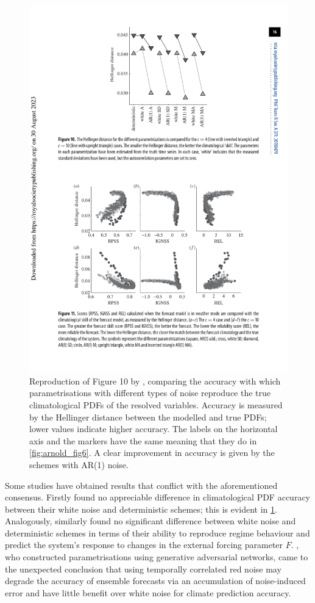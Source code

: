 \documentclass[titlepage,twoside]{article}
\numberwithin{equation}{section}
\begin{document}
\begin{figure}[H]
    \centering
    \includegraphics[width=0.4\linewidth]{figures/arnold2013_fig10.pdf}
    \caption{
        Reproduction of Figure 10 by \textcite{arnold2013}, comparing the
        accuracy with which parametrisations with different types of noise
        reproduce the true climatological PDFs of the resolved variables.
        Accuracy is measured by the Hellinger distance between the modelled
        and true PDFs; lower values indicate higher accuracy. The labels on
        the horizontal axis and the markers have the same meaning that they do
        in \cref{fig:arnold_fig6}. A clear improvement in accuracy is given
        by the schemes with AR(1) noise.
    }
    \label{fig:arnold_fig10}
\end{figure}

Some studies have obtained results that conflict with the aforementioned
consensus. Firstly \textcite{arnold2013} found no appreciable difference in
climatological PDF accuracy between their white noise and deterministic
schemes; this is evident in \cref{fig:arnold_fig10}. Analogously,
\textcite{christensen2015} similarly found no significant difference between
white noise and deterministic schemes in terms of their ability to reproduce
regime behaviour and predict the system's response to changes in the external
forcing parameter $F$. \textcite{gagne2020}, who constructed parametrisations
using generative adversarial networks, came to the unexpected conclusion that
using temporally correlated red noise may degrade the accuracy of ensemble
forecasts via an accumulation of noise-induced error and have little benefit
over white noise for climate prediction accuracy.
\end{document}
